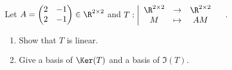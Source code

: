 \documentclass[11pt,nocut]{article}
\begin{document}
\begin{problem}[$\star$]
	Let $A 
	= \begin{pmatrix}
		2 & -1 \\
		2 & -1
	\end{pmatrix}
	\in \R^{2 \times 2}$ 
	and $\displaystyle
	T: \left| 
	\begin{array}{ccc}
		\R^{2 \times 2} & \to & \R^{2 \times 2}\\
		M & \mapsto & AM
	\end{array}
\right.\quad$.
\begin{enumerate}[label=\normalfont(\textbf{\alph*})]
	\item Show that $T$ is linear. 
	\item Give a basis of $\Ker(T)$ and a basis of $\Im(T)$.
\end{enumerate} 
\end{problem}



%
%
\end{document}

